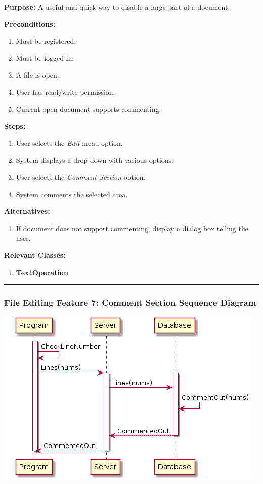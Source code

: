\documentclass[twoside,letterpaper]{article}
\begin{document}
	\noindent\textbf{Purpose:} A useful and quick way to disable a large part of a document. \newline
	
	\noindent\textbf{Preconditions:}
	\begin{enumerate}
		\item Must be registered.
		\item Must be logged in.
		\item A file is open.
		\item User has read/write permission.
		\item Current open document supports commenting.
	\end{enumerate}
	\noindent\textbf{Steps:}
	\begin{enumerate}
		\item User selects the \textit{Edit} menu option.
		\item System displays a drop-down with various options.
		\item User selects the \textit{Comment Section} option.
		\item System comments the selected area.
	\end{enumerate}
	\noindent\textbf{Alternatives:}
	\begin{enumerate}
		\item If document does not support commenting, display a dialog box telling the user.
	\end{enumerate}
	\noindent\textbf{Relevant Classes:}
	\begin{enumerate}
		\item \textbf {TextOperation}
	\end{enumerate}
\vspace{8pt}
\hrule
\newpage

\subsubsection[File Editing Feature 7: Comment Section Sequence Diagram]{\rmfamily\bfseries\color{black}
	File Editing Feature 7: Comment Section Sequence Diagram}
\hypertarget{RefHeading22059017292}{}

\bigskip

\includegraphics[width=\textwidth]{images/SequenceDiagrams/CommentOut}
\end{document}

